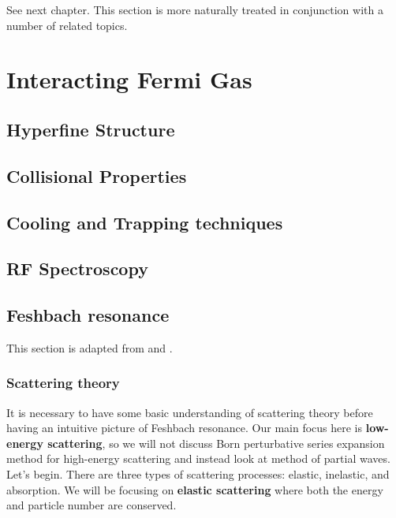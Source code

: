 \documentclass{book}
\theoremstyle{definition}
\begin{document}
See next chapter. This section is more naturally treated in conjunction with a number of related topics.


\chapter{Interacting Fermi Gas}


\section{Hyperfine Structure}

\section{Collisional Properties}


\section{Cooling and Trapping techniques}


\section{RF Spectroscopy}


\section{Feshbach resonance}

This section is adapted from \cite{campbellfeshbach} and \cite{ketterle2008making}.


\subsection{Scattering theory}




It is necessary to have some basic understanding of scattering theory before having an intuitive picture of Feshbach resonance. Our main focus here is \textbf{low-energy scattering}, so we will not discuss Born perturbative series expansion method for high-energy scattering and instead look at method of partial waves.\\

Let's begin. There are three types of scattering processes: elastic, inelastic, and absorption. We will be focusing on \textbf{elastic scattering} where both the energy and particle number are conserved.  \\
\end{document}
